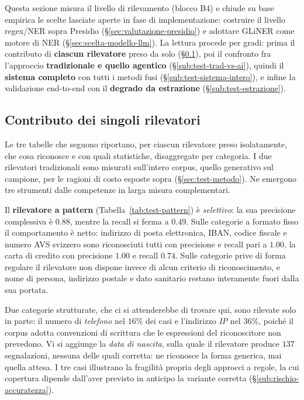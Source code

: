 Questa sezione misura il livello di rilevamento (blocco B4) e chiude su base empirica le scelte lasciate aperte in fase di implementazione: costruire il livello regex/NER sopra Presidio (§\ref{sec:valutazione-presidio}) e adottare GLiNER come motore di NER (§\ref{sec:scelta-modello-llm}). La lettura procede per gradi: prima il contributo di \textbf{ciascun rilevatore} preso da solo (§\ref{sub:test-per-detector}), poi il confronto fra l'approccio \textbf{tradizionale e quello agentico} (§\ref{sub:test-trad-vs-ai}), quindi il \textbf{sistema completo} con tutti i metodi fusi (§\ref{sub:test-sistema-intero}), e infine la validazione end-to-end con il \textbf{degrado da estrazione} (§\ref{sub:test-estrazione}).

\subsection{Contributo dei singoli rilevatori}
\label{sub:test-per-detector}

Le tre tabelle che seguono riportano, per ciascun rilevatore preso isolatamente, che cosa riconosce e con quali statistiche, disaggregate per categoria. I due rilevatori tradizionali sono misurati sull'intero corpus, quello generativo sul campione, per le ragioni di costo esposte sopra (§\ref{sec:test-metodo}). Ne emergono tre strumenti dalle competenze in larga misura complementari.

Il \textbf{rilevatore a pattern} (Tabella~\ref{tab:test-pattern}) è \emph{selettivo}: la sua precisione complessiva è $0.88$, mentre la recall si ferma a $0.49$. Sulle categorie a formato fisso il comportamento è netto: indirizzo di posta elettronica, IBAN, codice fiscale e numero AVS svizzero sono riconosciuti tutti con precisione e recall pari a $1.00$, la carta di credito con precisione $1.00$ e recall $0.74$. Sulle categorie prive di forma regolare il rilevatore non dispone invece di alcun criterio di riconoscimento, e nome di persona, indirizzo postale e dato sanitario restano interamente fuori dalla sua portata.

Due categorie strutturate, che ci si attenderebbe di trovare qui, sono rilevate solo in parte: il numero di \emph{telefono} nel $16$\% dei casi e l'indirizzo \emph{IP} nel $36$\%, poiché il corpus adotta convenzioni di scrittura che le espressioni del riconoscitore non prevedono. Vi si aggiunge la \emph{data di nascita}, sulla quale il rilevatore produce $137$ segnalazioni, nessuna delle quali corretta: ne riconosce la forma generica, mai quella attesa. I tre casi illustrano la fragilità propria degli approcci a regole, la cui copertura dipende dall'aver previsto in anticipo la variante corretta (§\ref{sub:rischio-accuratezza}).

